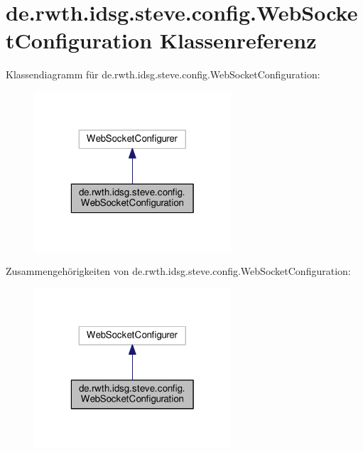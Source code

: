 \hypertarget{classde_1_1rwth_1_1idsg_1_1steve_1_1config_1_1_web_socket_configuration}{\section{de.\-rwth.\-idsg.\-steve.\-config.\-Web\-Socket\-Configuration Klassenreferenz}
\label{classde_1_1rwth_1_1idsg_1_1steve_1_1config_1_1_web_socket_configuration}
}


Klassendiagramm für de.\-rwth.\-idsg.\-steve.\-config.\-Web\-Socket\-Configuration\-:\nopagebreak
\begin{figure}[H]
\begin{center}
\leavevmode
\includegraphics[width=208pt]{classde_1_1rwth_1_1idsg_1_1steve_1_1config_1_1_web_socket_configuration__inherit__graph}
\end{center}
\end{figure}


Zusammengehörigkeiten von de.\-rwth.\-idsg.\-steve.\-config.\-Web\-Socket\-Configuration\-:\nopagebreak
\begin{figure}[H]
\begin{center}
\leavevmode
\includegraphics[width=208pt]{classde_1_1rwth_1_1idsg_1_1steve_1_1config_1_1_web_socket_configuration__coll__graph}
\end{center}
\end{figure}
